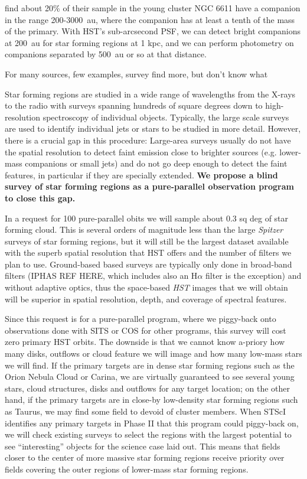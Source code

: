 \documentclass[12pt]{article}
\begin{document}
\citet{2001A&A...379..147D} find about 20\% of their sample in the young cluster NGC 6611 have a companion in the range 200-3000~au, where the companion has at least a tenth of the mass of the primary. With HST's sub-arcsecond PSF, we can detect bright companions at 200~au for star forming regions at 1 kpc, and we can perform photometry on companions separated by 500~au or so at that distance. 


For many sources, few examples, survey find more, but don't know what


Star forming regions are studied in a wide range of wavelengths from the X-rays to the radio with surveys spanning hundreds of square degrees down to high-resolution spectroscopy of individual objects. Typically, the large scale surveys are used to identify individual jets or stars to be studied in more detail. However, there is a crucial gap in this procedure: Large-area surveys usually do not have the spatial resolution to detect faint emission close to brighter sources (e.g. lower-mass companions or small jets) and do not go deep enough to detect the faint features, in particular if they are specially extended. \textbf{We propose a blind survey of star forming regions as a pure-parallel observation program to close this gap.}



In a request for 100 pure-parallel obits we will sample about 0.3 sq deg of star forming cloud. This is several orders of magnitude less than the large \emph{Spitzer} surveys of star forming regions, but it will still be the largest dataset available with the superb spatial resolution that HST offers and the number of filters we plan to use. Ground-based based surveys are typically only done in broad-band filters (IPHAS REF HERE, which includes also an H$\alpha$ filter is the exception) and without adaptive optics, thus the space-based \emph{HST} images that we will obtain will be superior in spatial resolution, depth, and coverage of spectral features.

Since this request is for a pure-parallel program, where we piggy-back onto observations done with SITS or COS for other programs, this survey will cost zero primary HST orbits. The downside is that we cannot know a-priory how many disks, outflows or cloud feature we will image and how many low-mass stars we will find. If the primary targets are in dense star forming regions such as the Orion Nebula Cloud or Carina, we are virtually guaranteed to see several young stars, cloud structures, disks and outflows for any target location; on the other hand, if the primary targets are in close-by low-density star forming regions such as Taurus, we may find some field to devoid of cluster members. When STScI identifies any primary targets in Phase II that this program could piggy-back on, we will check existing surveys to select the regions with the largest potential to see ``interesting'' objects for the science case laid out. This means that fields closer to the center of more massive star forming regions receive priority over fields covering the outer regions of lower-mass star forming regions.
\end{document}
